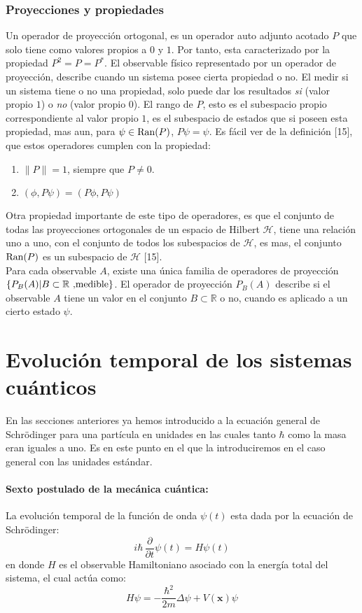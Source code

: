 \documentclass[12pt]{book}
\numberwithin{equation}{chapter}
\def\R{\mathbb{R}}
\def\H{\mathcal{H}}
\def\x{\mathbf{x}}
\begin{document}
\subsubsection{Proyecciones y propiedades}
Un operador de proyecci\'on ortogonal, es un operador auto adjunto acotado $P$ que solo tiene como valores propios a $0$ y $1$. Por tanto, esta caracterizado por la propiedad $P^{2}=P=P^{*}$. El observable f\'isico representado por un operador de proyecci\'on, describe cuando un sistema posee cierta propiedad o no. El medir si un sistema tiene o no una propiedad, solo puede dar los resultados \emph{si} (valor propio $1$) o \emph{no} (valor propio $0$). El rango de $P$, esto es el subespacio propio correspondiente al valor propio $1$, es el subespacio de estados que si poseen esta propiedad, mas aun, para $\psi \in \hbox{Ran}(P)$, $P\psi = \psi$. Es f\'acil ver de la definici\'on [15], que estos operadores cumplen con la propiedad:
\begin{enumerate}
\item $ \|P\|=1 $, siempre que $P\neq 0$.
\item $(\phi ,P \psi)= (P\phi ,P \psi)$
\end{enumerate}
Otra propiedad importante de este tipo de operadores, es que el conjunto de todas las proyecciones ortogonales de un espacio de Hilbert $\H$, tiene una relaci\'on uno a uno, con el conjunto de todos los subespacios de $\H$, es mas, el conjunto $\hbox{Ran}(P)$ es un subespacio de $\H$ [15].\\
Para cada observable $A$, existe una \'unica familia de operadores de proyecci\'on $\{ P_{B}(A) | B \subset \R \hbox{ ,medible} \}$. El operador de proyecci\'on $P_{B}(A)$ describe si el observable $A$ tiene un valor en el conjunto $B \subset \R$ o no, cuando es aplicado a un cierto estado $\psi$. 

\section{Evoluci\'on temporal de los sistemas cu\'anticos}
En las secciones anteriores ya hemos introducido a la ecuaci\'on general de Schr\"odinger para una part\'icula en unidades en las cuales tanto $\hbar$ como la masa eran iguales a uno. Es en este punto en el que la introduciremos en el caso general con las unidades est\'andar.\\

\paragraph{Sexto postulado de la mec\'anica cu\'antica:} 
La evoluci\'on temporal de la funci\'on de onda $\psi (t)$ esta dada por la ecuaci\'on de Schr\"odinger:
\begin{equation}
i \hbar \, \frac{\partial}{\partial t} \psi (t)= H \psi(t)
\end{equation}
en donde $H$ es el observable Hamiltoniano asociado con la energ\'ia total del sistema, el cual act\'ua como:
\begin{equation}
H \psi= -\frac{\hbar^{2}}{2m} \Delta \psi + V(\x) \psi
\end{equation}
\rightline{$\dag$}
\vspace{2 mm}
\end{document}
